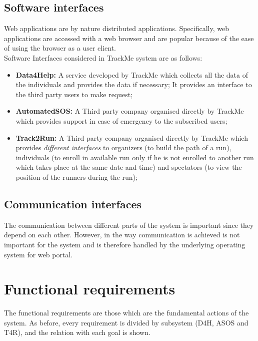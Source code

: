 \documentclass[hidelinks, 12pt]{report}
\begin{document}
\subsection{Software interfaces}
Web applications are by nature distributed applications. Specifically, web applications are accessed with a web browser and are popular because of the ease of using the browser as a user client.\\
Software Interfaces considered in TrackMe system are as follows:
\begin{itemize}
\item{} \textbf{Data4Help:} A service developed by TrackMe which collects all the data of the individuals and provides the data if necessary; It provides an interface to the third party users to make request;
\item{} \textbf{AutomatedSOS:} A Third party company organised directly by TrackMe which provides support in case of emergency to the subscribed users;
\item{} \textbf{Track2Run:} A Third party company organised directly by TrackMe which provides \textit{different interfaces} to organizers (to build the path of a run), individuals (to enroll in available run only if he is not enrolled to another run which takes place at the same date and time) and spectators (to view the position of the runners during the run);
\end{itemize}

\subsection{Communication interfaces}
The communication between different parts of the system is important since they depend on each other. However, in the way communication is achieved is not important for the system and is therefore handled by the underlying operating system for web portal.

\section{Functional requirements}
The functional requirements are those which are the fundamental actions of the system. As before, every requirement is divided by subsystem (D4H, ASOS and T4R), and the relation with each goal is shown.
\end{document}
